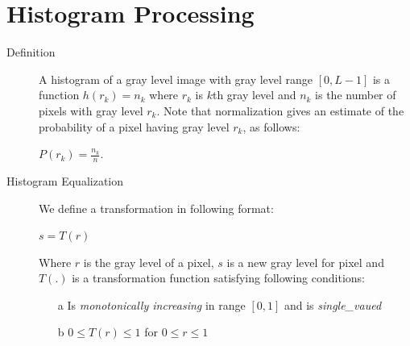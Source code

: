 \documentclass{article}
\begin{document}
\section{Histogram Processing}
\begin{description}
\item [Definition] A histogram of a gray level image with gray level range $[0, L-1]$ is a function $h(r_k) = n_k$ where $r_k$ is $k$th gray level and $n_k$ is the number of pixels with gray level $r_k$. Note that normalization gives an estimate of the probability of a pixel having gray level $r_k$, as follows:
\begin{center}
$P(r_k) = \frac{n_k}{n}.$
\end{center}

\item [Histogram Equalization] We define a transformation in following format:
\begin{center}
$s = T(r)$
\end{center}
Where $r$ is the gray level of a pixel, $s$ is a new gray level for pixel and $T(.)$ is a transformation function satisfying following conditions:
\begin{enumerate}
\item [a] Is \textit{monotonically increasing} in range $[0, 1]$ and is \textit{single\_vaued}
\item [b] $0 \leq T(r) \leq 1$ for $0 \leq r \leq 1$
\end{enumerate}
\end{description}
\end{document}
